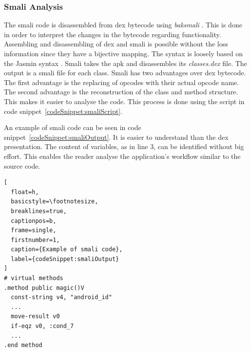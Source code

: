 \subsubsection{Smali Analysis} \label{subsection:tools-baksmali}
The smali code is disassembled from dex bytecode using \textit{baksmali} \cite{smali}.
This is done in order to interpret the changes in the bytecode regarding functionality.
\newline
Assembling and disassembling of dex and smali is possible without the loss information since they have a bijective mapping\cite{smali}.
The syntax is loosely based on the Jasmin syntax \cite{smali}.
Smali takes the \gls{apk} and disassembles its \textit{classes.dex} file.
The output is a smali file for each class.
Smali has two advantages over dex bytecode.
The first advantage is the replacing of opcodes with their actual opcode name.
The second advantage is the reconstruction of the class and method structure.
This makes it easier to analyse the code.
This process is done using the script in code snippet~\ref{codeSnippet:smaliScript}.
\newline

\newline
An example of smali code can be seen in code snippet~\ref{codeSnippet:smaliOutput}.
It is easier to understand than the dex presentation.
The content of variables, as in line 3, can be identified without big effort.
This enables the reader analyse the application's workflow similar to the source code.
\newline
\begin{lstlisting}[
  float=h,
  basicstyle=\footnotesize,
  breaklines=true,
  captionpos=b,
  frame=single,
  firstnumber=1,
  caption={Example of smali code},
  label={codeSnippet:smaliOutput}
]
# virtual methods
.method public magic()V
  const-string v4, "android_id"
  ...
  move-result v0
  if-eqz v0, :cond_7
  ...
.end method
\end{lstlisting}

